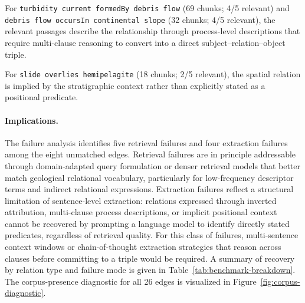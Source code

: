 \documentclass[10pt]{article}
\newcommand{\pred}[1]{\texttt{\small #1}}
\begin{document}
For \pred{turbidity current formedBy debris flow}
(69 chunks; 4/5 relevant) and \pred{debris flow
occursIn continental slope} (32 chunks; 4/5
relevant), the relevant passages describe the
relationship through process-level descriptions
that require multi-clause reasoning to convert into
a direct subject--relation--object triple.

For \pred{slide overlies hemipelagite} (18 chunks;
2/5 relevant), the spatial relation is implied by
the stratigraphic context rather than explicitly
stated as a positional predicate.

\paragraph{Implications.}
The failure analysis identifies five retrieval
failures and four extraction failures among the
eight unmatched edges.
Retrieval failures are in principle addressable
through domain-adapted query formulation or denser
retrieval models that better match geological
relational vocabulary, particularly for
low-frequency descriptor terms and indirect
relational expressions.
Extraction failures reflect a structural limitation
of sentence-level extraction: relations expressed
through inverted attribution, multi-clause process
descriptions, or implicit positional context
cannot be recovered by prompting a language model
to identify directly stated predicates, regardless
of retrieval quality.
For this class of failures, multi-sentence context
windows or chain-of-thought extraction strategies
that reason across clauses before committing to a
triple would be required.
A summary of recovery by relation type and failure
mode is given in Table~\ref{tab:benchmark-breakdown}.
The corpus-presence diagnostic for all 26 edges is
visualized in Figure~\ref{fig:corpus-diagnostic}.
\end{document}
